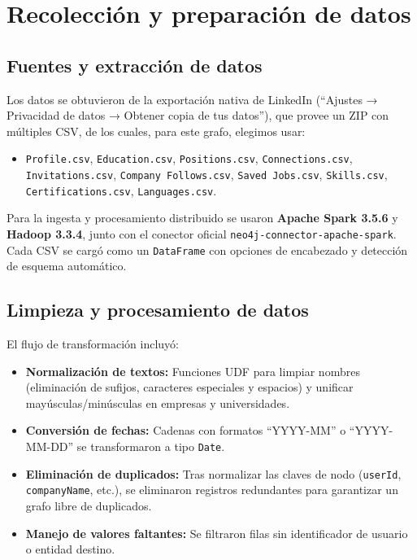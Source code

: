 \documentclass[10pt]{article}
\begin{document}
\section{Recolección y preparación de datos}

\subsection{Fuentes y extracción de datos}

Los datos se obtuvieron de la exportación nativa de LinkedIn (“Ajustes → Privacidad de datos → Obtener copia de tus datos”), que provee un ZIP con múltiples CSV, de los cuales, para este grafo, elegimos usar:

\begin{itemize}
	\item \texttt{Profile.csv}, \texttt{Education.csv}, \texttt{Positions.csv}, \texttt{Connections.csv},
	      \texttt{Invitations.csv}, \texttt{Company Follows.csv}, \texttt{Saved Jobs.csv},  
	      \texttt{Skills.csv}, \texttt{Certifications.csv}, \texttt{Languages.csv}.
\end{itemize}

Para la ingesta y procesamiento distribuido se usaron \textbf{Apache Spark 3.5.6} y \textbf{Hadoop 3.3.4}, junto con el conector oficial \texttt{neo4j-connector-apache-spark}. Cada CSV se cargó como un \texttt{DataFrame} con opciones de encabezado y detección de esquema automático.

\subsection{Limpieza y procesamiento de datos}

El flujo de transformación incluyó:

\begin{itemize}
	\item \textbf{Normalización de textos:}
	      Funciones UDF para limpiar nombres (eliminación de sufijos, caracteres especiales y espacios) y unificar mayúsculas/minúsculas en empresas y universidades.
	      
	\item \textbf{Conversión de fechas:}
	      Cadenas con formatos “YYYY-MM” o “YYYY-MM-DD” se transformaron a tipo \texttt{Date}.
	      
	\item \textbf{Eliminación de duplicados:}
	      Tras normalizar las claves de nodo (\texttt{userId}, \texttt{companyName}, etc.), se eliminaron registros redundantes para garantizar un grafo libre de duplicados.
	      
	\item \textbf{Manejo de valores faltantes:}
	      Se filtraron filas sin identificador de usuario o entidad destino.
\end{itemize}
\end{document}
